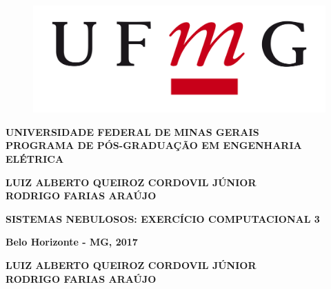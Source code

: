 \documentclass[12pt,a4paper]{article}
\numberwithin{equation}{section}
\begin{document}

\thispagestyle{empty}
\hspace{-2cm}
\begin{minipage}{0.35\textwidth}
\vspace{-2cm}
  \begin{figure}[H]
    \includegraphics[scale=0.07]{figures/UFMG-logo.png}
  \end{figure}
\end{minipage}
\begin{minipage}{0.7\textwidth}
\textbf{UNIVERSIDADE FEDERAL DE MINAS GERAIS} \\
\textbf{PROGRAMA DE PÓS-GRADUAÇÃO EM ENGENHARIA ELÉTRICA}\\
\end{minipage}


\vspace{40mm}
\begin{center}
\textbf{
LUIZ ALBERTO QUEIROZ CORDOVIL JÚNIOR \\
RODRIGO FARIAS ARAÚJO}
\end{center}

\vspace{50 mm}
\begin{center}
\textbf{SISTEMAS NEBULOSOS: EXERCÍCIO COMPUTACIONAL 3}\\
\end{center}

\vspace{85mm}

\begin{center}
\textbf{Belo Horizonte - MG, 2017}
\end{center}
\thispagestyle{empty}
\newpage


\thispagestyle{empty}

\vspace{3 mm}
\begin{center}
\textbf{
LUIZ ALBERTO QUEIROZ CORDOVIL JÚNIOR \\
RODRIGO FARIAS ARAÚJO}
\end{center}
\end{document}
